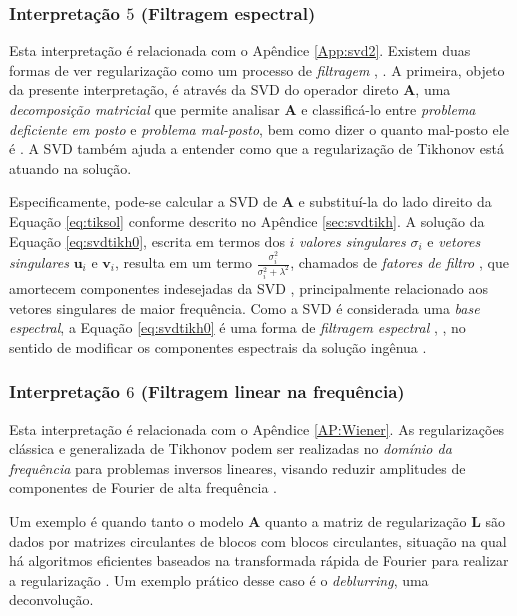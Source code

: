 \subsubsection{Interpretação $5$ (Filtragem espectral)}

Esta interpretação é relacionada com o Apêndice \ref{App:svd2}. Existem duas formas de ver regularização como um processo de \textit{filtragem} \cite{Hansen1998}, \cite[Seção 1.2]{Vogel2002}. A primeira, objeto da presente interpretação, é através da SVD do operador direto $\mathbf{A}$, uma \textit{decomposição matricial} que permite analisar $\mathbf{A}$ e classificá-lo entre \textit{problema deficiente em posto} e \textit{problema mal-posto}, bem como dizer o quanto mal-posto ele é \cite{Hansen1998}. A SVD também ajuda a entender como que a regularização de Tikhonov está atuando na solução. 

Especificamente, pode-se calcular a SVD de $\mathbf{A}$ e substituí-la do lado direito da Equação \eqref{eq:tiksol} conforme descrito no Apêndice \ref{sec:svdtikh}. A solução da Equação \eqref{eq:svdtikh0}, escrita em termos dos $i$ \textit{valores singulares} $\sigma_i$ e \textit{vetores singulares} $\mathbf{u}_i$ e $\mathbf{v}_i$, resulta em um termo $\frac{\sigma_i^2}{\sigma_i^2 + \lambda^2}$, chamados de \textit{fatores de filtro} \cite[pág. 62]{hansen2010discrete}, que amortecem componentes indesejadas da SVD \cite[págs. 106-7]{aster2019parameter}, principalmente relacionado aos vetores singulares de maior frequência. Como a SVD é considerada uma \textit{base espectral}, a Equação \eqref{eq:svdtikh0} é uma forma de \textit{filtragem espectral} \cite[pág. 71]{hansen2006deblurring}, \cite[págs. 53, 177]{hansen2010discrete}, no sentido de modificar os componentes espectrais da solução ingênua \cite{hansen2006deblurring}. 

\subsubsection{Interpretação $6$ (Filtragem linear na frequência)}
Esta interpretação é relacionada com o Apêndice \ref{AP:Wiener}. As regularizações clássica e generalizada de Tikhonov podem ser realizadas no \textit{domínio da frequência} para problemas inversos lineares, visando reduzir amplitudes de componentes de Fourier de alta frequência \cite[pág. 230]{aster2019parameter}. 

Um exemplo é quando tanto o modelo $\mathbf{A}$ quanto a matriz de regularização $\mathbf{L}$ são dados por matrizes circulantes de blocos com blocos circulantes, situação na qual há algoritmos eficientes baseados na transformada rápida de Fourier para realizar a regularização \cite[Algoritmo 5.3.1]{Vogel2002}. Um exemplo prático desse caso é o \textit{deblurring}, uma deconvolução. 

